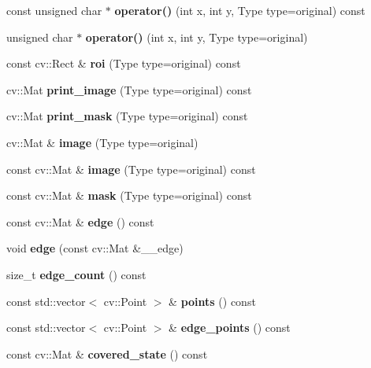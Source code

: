 \begin{DoxyCompactItemize}
const unsigned char $\ast$ {\bfseries operator()} (int x, int y, Type type=original) const
\item 
\hypertarget{classskl_1_1_patch_a2266c93571c9388fff4cf7402770700d}{}\label{classskl_1_1_patch_a2266c93571c9388fff4cf7402770700d} 
unsigned char $\ast$ {\bfseries operator()} (int x, int y, Type type=original)
\item 
\hypertarget{classskl_1_1_patch_aa3de02f7f9a20e028855c273300d0986}{}\label{classskl_1_1_patch_aa3de02f7f9a20e028855c273300d0986} 
const cv\+::\+Rect \& {\bfseries roi} (Type type=original) const
\item 
\hypertarget{classskl_1_1_patch_aed50eddb4214b3ff6024455bccb8ecd7}{}\label{classskl_1_1_patch_aed50eddb4214b3ff6024455bccb8ecd7} 
cv\+::\+Mat {\bfseries print\+\_\+image} (Type type=original) const
\item 
\hypertarget{classskl_1_1_patch_a9130cd5aa346fc64aa2fec63ecc42319}{}\label{classskl_1_1_patch_a9130cd5aa346fc64aa2fec63ecc42319} 
cv\+::\+Mat {\bfseries print\+\_\+mask} (Type type=original) const
\item 
\hypertarget{classskl_1_1_patch_a235e134d5cf9c682bf800acf1b291c88}{}\label{classskl_1_1_patch_a235e134d5cf9c682bf800acf1b291c88} 
cv\+::\+Mat \& {\bfseries image} (Type type=original)
\item 
\hypertarget{classskl_1_1_patch_a4144c1f974ac9f2139830ec7d80f2005}{}\label{classskl_1_1_patch_a4144c1f974ac9f2139830ec7d80f2005} 
const cv\+::\+Mat \& {\bfseries image} (Type type=original) const
\item 
\hypertarget{classskl_1_1_patch_a289a61ef226dbcd31a2f3d421d16a1c2}{}\label{classskl_1_1_patch_a289a61ef226dbcd31a2f3d421d16a1c2} 
const cv\+::\+Mat \& {\bfseries mask} (Type type=original) const
\item 
\hypertarget{classskl_1_1_patch_aef6de246ed39db02b5384afeb805d9cc}{}\label{classskl_1_1_patch_aef6de246ed39db02b5384afeb805d9cc} 
const cv\+::\+Mat \& {\bfseries edge} () const
\item 
\hypertarget{classskl_1_1_patch_a081388c13161c8136a45e691473ed087}{}\label{classskl_1_1_patch_a081388c13161c8136a45e691473ed087} 
void {\bfseries edge} (const cv\+::\+Mat \&\+\_\+\+\_\+edge)
\item 
\hypertarget{classskl_1_1_patch_a6b08f6c05423685d8ba63f1f0025ada1}{}\label{classskl_1_1_patch_a6b08f6c05423685d8ba63f1f0025ada1} 
size\+\_\+t {\bfseries edge\+\_\+count} () const
\item 
\hypertarget{classskl_1_1_patch_a29c1684e0b6edce4dab2aa881924692d}{}\label{classskl_1_1_patch_a29c1684e0b6edce4dab2aa881924692d} 
const std\+::vector$<$ cv\+::\+Point $>$ \& {\bfseries points} () const
\item 
\hypertarget{classskl_1_1_patch_a5795c9ea377512c81a1d4d22f34fe2c1}{}\label{classskl_1_1_patch_a5795c9ea377512c81a1d4d22f34fe2c1} 
const std\+::vector$<$ cv\+::\+Point $>$ \& {\bfseries edge\+\_\+points} () const
\item 
\hypertarget{classskl_1_1_patch_af03652c43ac6a4efb37283d2dfb25d24}{}\label{classskl_1_1_patch_af03652c43ac6a4efb37283d2dfb25d24} 
const cv\+::\+Mat \& {\bfseries covered\+\_\+state} () const
\end{DoxyCompactItemize}
